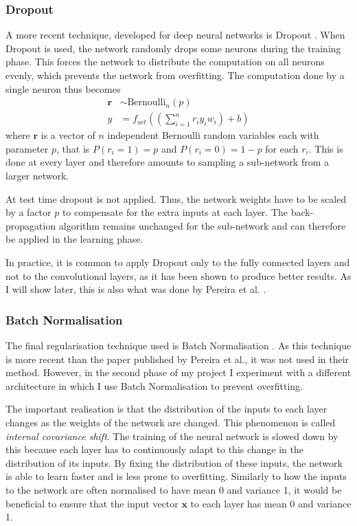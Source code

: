 \documentclass[12pt,a4paper,twoside,openright]{report}
\begin{document}
\subsubsection{Dropout}
A more recent technique, developed for deep neural networks is Dropout \cite{dropout}. When Dropout is used, the network randomly drops some neurons during the training phase. This forces the network to distribute the computation on all neurons evenly, which prevents the network from overfitting. The computation done by a single neuron thus becomes
\begin{equation}
\begin{split}
	\textbf{r} & \sim \text{Bernoulli}_n(p) \\
	y & = f_{act}((\sum_{i=1}^{n} r_i y_i w_i) + b)
\end{split}
\end{equation}
where $\textbf{r}$ is a vector of $n$ independent Bernoulli random variables each with parameter $p$, that is $P(r_i = 1) = p$ and $P(r_i = 0) = 1 - p$ for each $r_i$. This is done at every layer and therefore amounts to sampling a sub-network from a larger network. 

At test time dropout is not applied. Thus, the network weights have to be scaled by a factor $p$ to compensate for the extra inputs at each layer. The back-propagation algorithm remains unchanged for the sub-network and can therefore be applied in the learning phase.

In practice, it is common to apply Dropout only to the fully connected layers and not to the convolutional layers, as it has been shown to produce better results. As I will show later, this is also what was done by Pereira et al. \cite{pereira}.

\subsubsection{Batch Normalisation}
The final regularisation technique used is Batch Normalisation \cite{batch_normalization}. As this technique is more recent than the paper published by Pereira et al., it was not used in their method. However, in the second phase of my project I experiment with a different architecture in which I use Batch Normalisation to prevent overfitting.

The important realisation is that the distribution of the inputs to each layer changes as the weights of the network are changed. This phenomenon is called \textit{internal covariance shift}. The training of the neural network is slowed down by this because each layer has to continuously adapt to this change in the distribution of its inputs. By fixing the distribution of these inputs, the network is able to learn faster and is less prone to overfitting. Similarly to how the inputs to the network are often normalised to have mean 0 and variance 1, it would be beneficial to ensure that the input vector $\textbf{x}$ to each layer has mean 0 and variance 1. 
\end{document}
